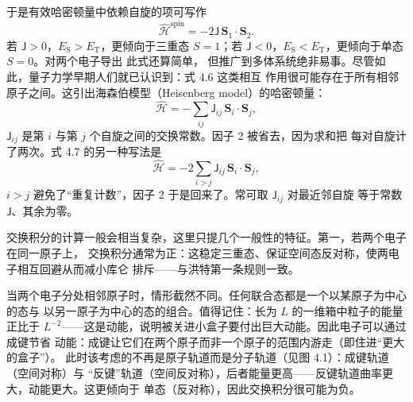 于是有效哈密顿量中依赖自旋的项可写作
\begin{equation*}
\hat{\mathcal{H}}^{\text{spin}} = -2\mathsf{J}\,\mathbf{S}_1\cdot\mathbf{S}_2.\tag{4.6}
\end{equation*}
若 $\mathsf{J}>0$，$E_{\mathrm{S}}>E_{\mathrm{T}}$，更倾向于三重态 $S=1$；若
$\mathsf{J}<0$，$E_{\mathrm{S}}<E_{\mathrm{T}}$，更倾向于单态 $S=0$。对两个电子导出
此式还算简单，
但推广到多体系统绝非易事。尽管如此，量子力学早期人们就已认识到：式 4.6 这类相互
作用很可能存在于所有相邻原子之间。这引出海森伯模型（Heisenberg model）的哈密顿量：
\begin{equation*}
\hat{\mathcal{H}} = -\sum_{ij}\mathsf{J}_{ij}\,\mathbf{S}_i\cdot\mathbf{S}_j,\tag{4.7}
\end{equation*}
$\mathsf{J}_{ij}$ 是第 $i$ 与第 $j$ 个自旋之间的交换常数。因子 2 被省去，因为求和把
每对自旋计了两次。式 4.7 的另一种写法是
\begin{equation*}
\hat{\mathcal{H}} = -2\sum_{i>j}\mathsf{J}_{ij}\,\mathbf{S}_i\cdot\mathbf{S}_j,\tag{4.8}
\end{equation*}
$i>j$ 避免了“重复计数”，因子 2 于是回来了。常可取 $\mathsf{J}_{ij}$ 对最近邻自旋
等于常数 $\mathsf{J}$、其余为零。

交换积分的计算一般会相当复杂，这里只提几个一般性的特征。第一，若两个电子在同一原子上，
交换积分通常为正：这稳定三重态、保证空间态反对称，使两电子相互回避从而减小库仑
排斥——与洪特第一条规则一致。

当两个电子分处相邻原子时，情形截然不同。任何联合态都是一个以某原子为中心的态与
以另一原子为中心的态的组合。值得记住：长为 $L$ 的一维箱中粒子的能量正比于
$L^{-2}$——这是动能，说明被关进小盒子要付出巨大动能。因此电子可以通过成键节省
动能：成键让它们在两个原子而非一个原子的范围内游走（即住进“更大的盒子”）。
此时该考虑的不再是原子轨道而是分子轨道（见图 4.1）：成键轨道（空间对称）与
“反键”轨道（空间反对称），后者能量更高——反键轨道曲率更大，动能更大。这更倾向于
单态（反对称），因此交换积分很可能为负。

